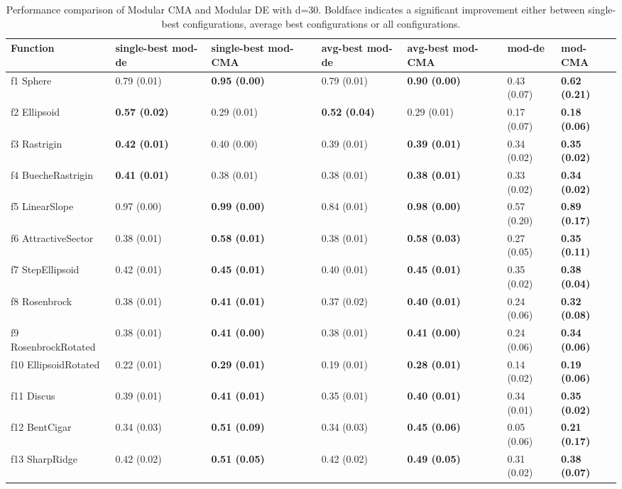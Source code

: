 \begin{table}
\caption{Performance comparison of Modular CMA and Modular DE with d=30. Boldface indicates a significant improvement either between single-best configurations, average best configurations or all configurations.}
\begin{tabular}{lllllll}
\toprule
Function & single-best mod-de & single-best mod-CMA & avg-best mod-de & avg-best mod-CMA & mod-de & mod-CMA \\
\midrule
f1 Sphere & 0.79 (0.01) & \textbf{0.95 (0.00)} & 0.79 (0.01) & \textbf{0.90 (0.00)} & 0.43 (0.07) & \textbf{0.62 (0.21)} \\
f2 Ellipsoid & \textbf{0.57 (0.02)} & 0.29 (0.01) & \textbf{0.52 (0.04)} & 0.29 (0.01) & 0.17 (0.07) & \textbf{0.18 (0.06)} \\
f3 Rastrigin & \textbf{0.42 (0.01)} & 0.40 (0.00) & 0.39 (0.01) & \textbf{0.39 (0.01)} & 0.34 (0.02) & \textbf{0.35 (0.02)} \\
f4 BuecheRastrigin & \textbf{0.41 (0.01)} & 0.38 (0.01) & 0.38 (0.01) & \textbf{0.38 (0.01)} & 0.33 (0.02) & \textbf{0.34 (0.02)} \\
f5 LinearSlope & 0.97 (0.00) & \textbf{0.99 (0.00)} & 0.84 (0.01) & \textbf{0.98 (0.00)} & 0.57 (0.20) & \textbf{0.89 (0.17)} \\
f6 AttractiveSector & 0.38 (0.01) & \textbf{0.58 (0.01)} & 0.38 (0.01) & \textbf{0.58 (0.03)} & 0.27 (0.05) & \textbf{0.35 (0.11)} \\
f7 StepEllipsoid & 0.42 (0.01) & \textbf{0.45 (0.01)} & 0.40 (0.01) & \textbf{0.45 (0.01)} & 0.35 (0.02) & \textbf{0.38 (0.04)} \\
f8 Rosenbrock & 0.38 (0.01) & \textbf{0.41 (0.01)} & 0.37 (0.02) & \textbf{0.40 (0.01)} & 0.24 (0.06) & \textbf{0.32 (0.08)} \\
f9 RosenbrockRotated & 0.38 (0.01) & \textbf{0.41 (0.00)} & 0.38 (0.01) & \textbf{0.41 (0.00)} & 0.24 (0.06) & \textbf{0.34 (0.06)} \\
f10 EllipsoidRotated & 0.22 (0.01) & \textbf{0.29 (0.01)} & 0.19 (0.01) & \textbf{0.28 (0.01)} & 0.14 (0.02) & \textbf{0.19 (0.06)} \\
f11 Discus & 0.39 (0.01) & \textbf{0.41 (0.01)} & 0.35 (0.01) & \textbf{0.40 (0.01)} & 0.34 (0.01) & \textbf{0.35 (0.02)} \\
f12 BentCigar & 0.34 (0.03) & \textbf{0.51 (0.09)} & 0.34 (0.03) & \textbf{0.45 (0.06)} & 0.05 (0.06) & \textbf{0.21 (0.17)} \\
f13 SharpRidge & 0.42 (0.02) & \textbf{0.51 (0.05)} & 0.42 (0.02) & \textbf{0.49 (0.05)} & 0.31 (0.02) & \textbf{0.38 (0.07)} \\

\end{tabular}
\end{table}
